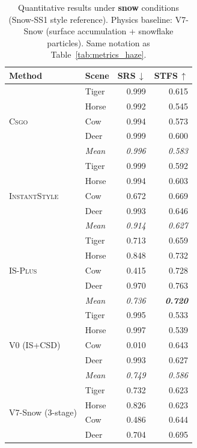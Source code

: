 \begin{table}[htbp]
  \centering\small
  \caption{Quantitative results under \textbf{snow} conditions (Snow-SS1 style reference). Physics baseline: V7-Snow (surface accumulation + snowflake particles). Same notation as Table~\ref{tab:metrics_haze}.}
  \label{tab:metrics_snow}
  \setlength{\tabcolsep}{4pt}
  \begin{tabular}{@{}llrr@{}}
    \toprule
    \textbf{Method} & \textbf{Scene} & \textbf{SRS\,$\downarrow$} & \textbf{STFS\,$\uparrow$} \\
    \midrule
    \multirow{5}{*}{\textsc{Csgo}} & Tiger & 0.999 & 0.615 \\
    & Horse & 0.992 & 0.545 \\
    & Cow & 0.994 & 0.573 \\
    & Deer & 0.999 & 0.600 \\
    & \textit{Mean} & \textit{0.996} & \textit{0.583} \\
    \midrule
    \multirow{5}{*}{\textsc{InstantStyle}} & Tiger & 0.999 & 0.592 \\
    & Horse & 0.994 & 0.603 \\
    & Cow & 0.672 & 0.669 \\
    & Deer & 0.993 & 0.646 \\
    & \textit{Mean} & \textit{0.914} & \textit{0.627} \\
    \midrule
    \multirow{5}{*}{\textsc{IS-Plus}} & Tiger & 0.713 & 0.659 \\
    & Horse & 0.848 & 0.732 \\
    & Cow & 0.415 & 0.728 \\
    & Deer & 0.970 & 0.763 \\
    & \textit{Mean} & \textit{0.736} & \textit{\textbf{0.720}} \\
    \midrule
    \multirow{5}{*}{V0 (IS+CSD)} & Tiger & 0.995 & 0.533 \\
    & Horse & 0.997 & 0.539 \\
    & Cow & 0.010 & 0.643 \\
    & Deer & 0.993 & 0.627 \\
    & \textit{Mean} & \textit{0.749} & \textit{0.586} \\
    \midrule
    \multirow{5}{*}{V7-Snow (3-stage)} & Tiger & 0.732 & 0.623 \\
    & Horse & 0.826 & 0.623 \\
    & Cow & 0.486 & 0.644 \\
    & Deer & 0.704 & 0.695 \\

\end{tabular}
\end{table}

